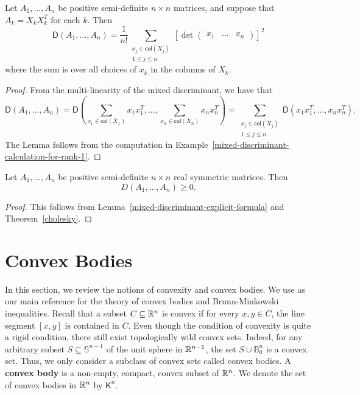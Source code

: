 \documentclass{puthesis-UG}
\begin{document}
\begin{lem}  \label{mixed-discriminant-explicit-formula}
	Let $A_1, \ldots, A_n$ be positive semi-definite $n \times n$ matrices, and suppose that $A_k = X_k X_k^T$ for each $k$. Then
	\[
		\mathsf{D} (A_1, \ldots, A_n) = \frac{1}{n!} \sum_{\substack{x_j \in \mathsf{col}(X_j) \\ 1 \leq j \leq n}} \left [ \det \begin{pmatrix} x_1 & \ldots & x_n \end{pmatrix} \right ]^2
	\]
	where the sum is over all choices of $x_k$ in the columns of $X_k$. 
\end{lem}

\begin{proof}
	From the multi-linearity of the mixed discriminant, we have that 
	\[
		\mathsf{D}(A_1, \ldots, A_n) = \mathsf{D} \left ( \sum_{x_1 \in \mathsf{col}(X_1)} x_1x_1^T, \ldots, \sum_{x_n \in \mathsf{col}(X_n)} x_nx_n^T \right ) = \sum_{\substack{x_j \in \mathsf{col}(X_j) \\ 1 \leq j \leq n}} \mathsf{D} (x_1x_1^T, \ldots, x_nx_n^T).
	\]
	The Lemma follows from the computation in Example~\ref{mixed-discriminant-calculation-for-rank-1}. 
\end{proof}

\begin{cor}
	Let $A_1, \ldots, A_n$ be positive semi-definite $n \times n$ real symmetric matrices. Then 
	\[
		D(A_1, \ldots, A_n) \geq 0.
	\]	
\end{cor}

\begin{proof}
	This follows from Lemma~\ref{mixed-discriminant-explicit-formula} and Theorem~\ref{cholesky}. 
\end{proof}

\section{Convex Bodies}

In this section, we review the notions of convexity and convex bodies. We use \cite{schneider_2013} as our main reference for the theory of convex bodies and Brunn-Minkowski inequalities. Recall that a subset $C \subseteq \mathbb{R}^n$ is convex if for every $x, y \in C$, the line segment $[x, y]$ is contained in $C$. Even though the condition of convexity is quite a rigid condition, there still exist topologically wild convex sets. Indeed, for any arbitrary subset $S \subseteq \mathbb{S}^{n-1}$ of the unit sphere in $\mathbb{R}^{n-1}$, the set $S \cup \mathbb{B}_0^n$ is a convex set. Thus, we only consider a subclass of convex sets called convex bodies. A \textbf{convex body} is a non-empty, compact, convex subset of $\mathbb{R}^n$. We denote the set of convex bodies in $\mathbb{R}^n$ by $\mathsf{K}^n$.
\end{document}

